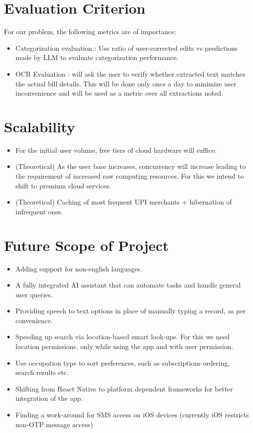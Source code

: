 \documentclass[11pt,a4paper]{article}
\begin{document}
\section{Evaluation Criterion %
}
For our problem, the following metrics are of importance:
\begin{itemize}[leftmargin=0.7cm]
    \item Categorization evaluation : Use ratio of user-corrected edits vs predictions made by LLM to evaluate categorization performance.
    \item OCR Evaluation : will ask the user to verify whether extracted text matches the actual bill details. This will be done only once a day to minimize user inconvenience and will be used as a metric over all extractions noted.
\end{itemize}


\section{Scalability %
}
\begin{itemize}[leftmargin=0.7cm]
    \item For the initial user volume, free tiers of cloud hardware will suffice.
    \item (Theoretical) As the user base increases, concurrency will increase leading to the requirement of increased raw computing resources. For this we intend to shift to premium cloud services.
    \item (Theoretical) Caching of most frequent UPI merchants + hibernation of infrequent ones.
\end{itemize}



\section{Future Scope of Project %
}
\begin{itemize}[leftmargin=0.7cm]
    \item Adding support for non-english languages.
    \item A fully integrated AI assistant that can automate tasks and handle general user queries.
    \item Providing speech to text options in place of manually typing a record, as per convenience.
    \item Speeding up search via location-based smart look-ups. For this we need location permissions, only while using the app and with user permission.
    \item Use occupation type to sort preferences, such as subscriptions ordering, search results etc.
    \item Shifting from React Native to platform dependent frameworks for better integration of the app.
    \item Finding a work-around for SMS access on iOS devices (currently iOS restricts non-OTP message access)
\end{itemize}
\end{document}
